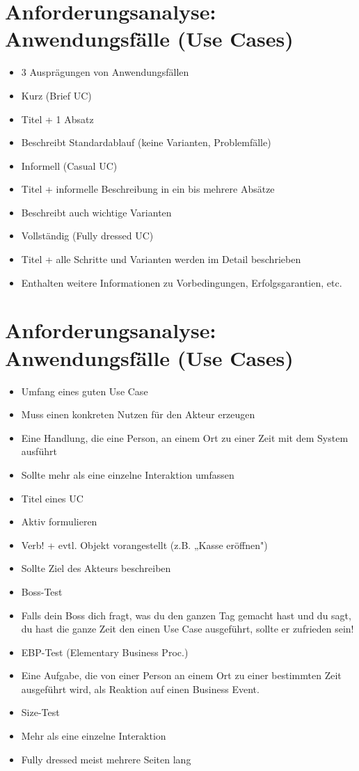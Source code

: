 \documentclass[10pt]{article}
\begin{document}
\section*{Anforderungsanalyse: Anwendungsfälle (Use Cases)}
\begin{itemize}
  \item 3 Ausprägungen von Anwendungsfällen
  \item Kurz (Brief UC)
  \item Titel + 1 Absatz
  \item Beschreibt Standardablauf (keine Varianten, Problemfälle)
  \item Informell (Casual UC)
  \item Titel + informelle Beschreibung in ein bis mehrere Absätze
  \item Beschreibt auch wichtige Varianten
  \item Vollständig (Fully dressed UC)
  \item Titel + alle Schritte und Varianten werden im Detail beschrieben
  \item Enthalten weitere Informationen zu Vorbedingungen, Erfolgsgarantien, etc.
\end{itemize}

\section*{Anforderungsanalyse: Anwendungsfälle (Use Cases)}
\begin{itemize}
  \item Umfang eines guten Use Case
  \item Muss einen konkreten Nutzen für den Akteur erzeugen
  \item Eine Handlung, die eine Person, an einem Ort zu einer Zeit mit dem System ausführt
  \item Sollte mehr als eine einzelne Interaktion umfassen
  \item Titel eines UC
  \item Aktiv formulieren
  \item Verb! + evtl. Objekt vorangestellt (z.B. „Kasse eröffnen")
  \item Sollte Ziel des Akteurs beschreiben
  \item Boss-Test
  \item Falls dein Boss dich fragt, was du den ganzen Tag gemacht hast und du sagt, du hast die ganze Zeit den einen Use Case ausgeführt, sollte er zufrieden sein!
  \item EBP-Test (Elementary Business Proc.)
  \item Eine Aufgabe, die von einer Person an einem Ort zu einer bestimmten Zeit ausgeführt wird, als Reaktion auf einen Business Event.
  \item Size-Test
  \item Mehr als eine einzelne Interaktion
  \item Fully dressed meist mehrere Seiten lang
\end{itemize}
\end{document}
